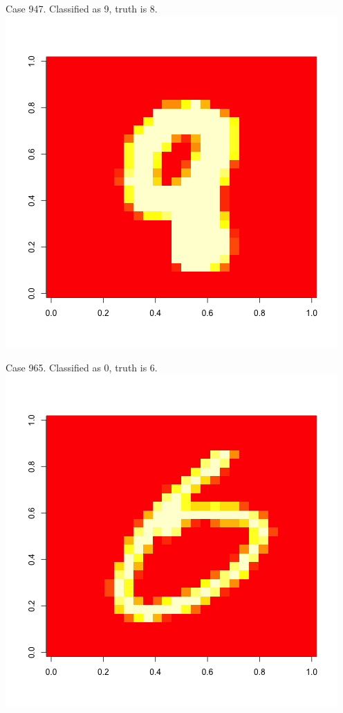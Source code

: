 \documentclass[10pt]{extarticle}
\begin{document}
Case 947. Classified as 9, truth is 8. 
\includegraphics[scale=.4] {../Images/947.png}

Case 965. Classified as 0, truth is 6. 
\includegraphics[scale=.4] {../Images/965.png}
\end{document}
